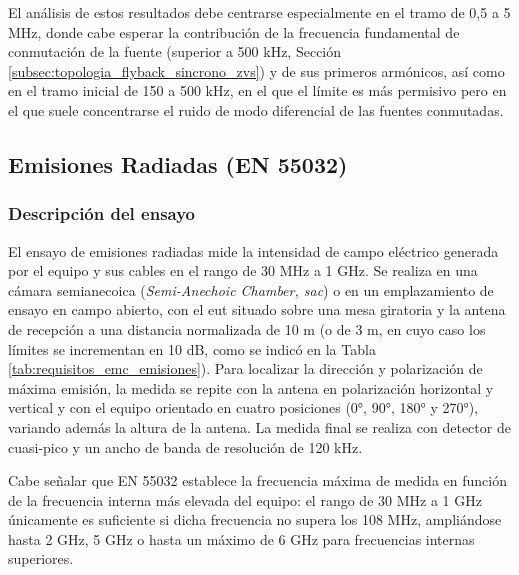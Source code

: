 El análisis de estos resultados debe centrarse especialmente en el tramo de 0,5 a 5 MHz, donde cabe esperar la contribución de la frecuencia fundamental de conmutación de la fuente (superior a 500 kHz, Sección \ref{subsec:topologia_flyback_sincrono_zvs}) y de sus primeros armónicos, así como en el tramo inicial de 150 a 500 kHz, en el que el límite es más permisivo pero en el que suele concentrarse el ruido de modo diferencial de las fuentes conmutadas.

\subsection{Emisiones Radiadas (EN 55032)}
\label{subsec:emisiones_radiadas}

\subsubsection*{Descripción del ensayo}

El ensayo de emisiones radiadas mide la intensidad de campo eléctrico generada por el equipo y sus cables en el rango de 30 MHz a 1 GHz. Se realiza en una cámara semianecoica (\textit{Semi-Anechoic Chamber, \gls{sac}}) o en un emplazamiento de ensayo en campo abierto, con el \gls{eut} situado sobre una mesa giratoria y la antena de recepción a una distancia normalizada de 10 m (o de 3 m, en cuyo caso los límites se incrementan en 10 dB, como se indicó en la Tabla \ref{tab:requisitos_emc_emisiones}). Para localizar la dirección y polarización de máxima emisión, la medida se repite con la antena en polarización horizontal y vertical y con el equipo orientado en cuatro posiciones (0°, 90°, 180° y 270°), variando además la altura de la antena. La medida final se realiza con detector de cuasi-pico y un ancho de banda de resolución de 120 kHz.

Cabe señalar que EN 55032 establece la frecuencia máxima de medida en función de la frecuencia interna más elevada del equipo: el rango de 30 MHz a 1 GHz únicamente es suficiente si dicha frecuencia no supera los 108 MHz, ampliándose hasta 2 GHz, 5 GHz o hasta un máximo de 6 GHz para frecuencias internas superiores.

